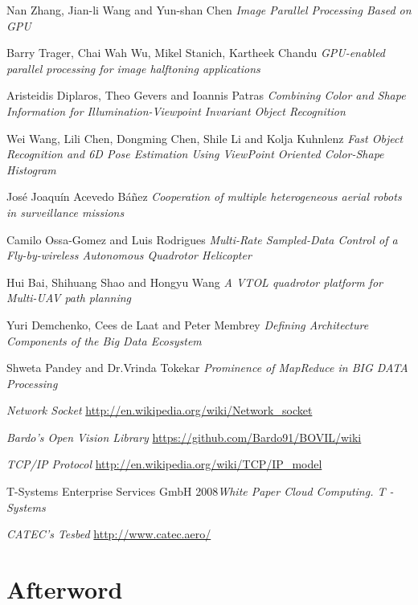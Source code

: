 \documentclass[11pt, oneside]{book} %
\begin{document}
\begin{thebibliography}{9}
 Nan Zhang, Jian-li Wang and Yun-shan Chen  \textit{Image Parallel Processing Based on GPU }

 Barry Trager, Chai Wah Wu, Mikel Stanich, Kartheek Chandu  \textit{GPU-enabled parallel processing for image halftoning applications}

  Aristeidis Diplaros, Theo Gevers and Ioannis Patras \textit{Combining Color and Shape Information for Illumination-Viewpoint Invariant Object Recognition}

 Wei Wang, Lili Chen, Dongming Chen, Shile Li and Kolja Kuhnlenz  \textit{Fast Object Recognition and 6D Pose Estimation Using ViewPoint Oriented Color-Shape Histogram}

 José Joaquín Acevedo B\'añez  \textit{Cooperation of multiple heterogeneous aerial robots in surveillance missions}

  Camilo Ossa-Gomez and Luis Rodrigues \textit{Multi-Rate Sampled-Data Control of a Fly-by-wireless Autonomous Quadrotor Helicopter}

 Hui Bai, Shihuang Shao and Hongyu Wang \textit{A VTOL quadrotor platform for Multi-UAV path planning}

 Yuri Demchenko, Cees de Laat and Peter Membrey \textit{Defining Architecture Components of the Big Data Ecosystem }

 Shweta Pandey  and Dr.Vrinda Tokekar \textit{Prominence of MapReduce in BIG DATA Processing}

\bibitem{}   \textit{}

 \textit{Network Socket} \url{http://en.wikipedia.org/wiki/Network_socket}

 \textit{Bardo's Open Vision Library} \url{https://github.com/Bardo91/BOVIL/wiki}

 \textit{TCP/IP Protocol}  \url{http://en.wikipedia.org/wiki/TCP/IP_model}

 T-Systems Enterprise Services GmbH 2008\textit{White Paper Cloud Computing. T - Systems} 

 \textit {CATEC's Tesbed} \url{http://www.catec.aero/}

\end{thebibliography}

\backmatter

\chapter{Afterword}
\end{document}
